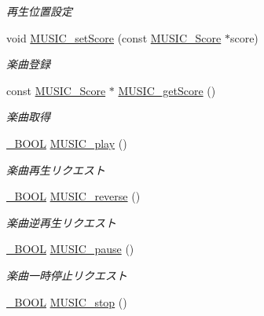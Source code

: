 \begin{DoxyCompactItemize}
\begin{DoxyCompactList}\small\item\em 再生位置設定 \end{DoxyCompactList}\item 
void \hyperlink{music_8h_aa6d0fea87bf8436f1abda3968ef54a47_aa6d0fea87bf8436f1abda3968ef54a47}{M\+U\+S\+I\+C\+\_\+set\+Score} (const \hyperlink{music_8h_d3/dd6/structMUSIC__Score}{M\+U\+S\+I\+C\+\_\+\+Score} $\ast$score)
\begin{DoxyCompactList}\small\item\em 楽曲登録 \end{DoxyCompactList}\item 
const \hyperlink{music_8h_d3/dd6/structMUSIC__Score}{M\+U\+S\+I\+C\+\_\+\+Score} $\ast$ \hyperlink{music_8h_a685ed593f10455fd1286fcc7ab1011e7_a685ed593f10455fd1286fcc7ab1011e7}{M\+U\+S\+I\+C\+\_\+get\+Score} ()
\begin{DoxyCompactList}\small\item\em 楽曲取得 \end{DoxyCompactList}\item 
\hyperlink{stddef_8h_afbf708854fe02af8475a9ba02f3196cb_afbf708854fe02af8475a9ba02f3196cb}{\+\_\+\+B\+O\+O\+L} \hyperlink{music_8h_a9d41a9ee0630a3ffb22c5f0885d39ee5_a9d41a9ee0630a3ffb22c5f0885d39ee5}{M\+U\+S\+I\+C\+\_\+play} ()
\begin{DoxyCompactList}\small\item\em 楽曲再生リクエスト \end{DoxyCompactList}\item 
\hyperlink{stddef_8h_afbf708854fe02af8475a9ba02f3196cb_afbf708854fe02af8475a9ba02f3196cb}{\+\_\+\+B\+O\+O\+L} \hyperlink{music_8h_af043ae70cb6cffbf9ab4c4e759187a69_af043ae70cb6cffbf9ab4c4e759187a69}{M\+U\+S\+I\+C\+\_\+reverse} ()
\begin{DoxyCompactList}\small\item\em 楽曲逆再生リクエスト \end{DoxyCompactList}\item 
\hyperlink{stddef_8h_afbf708854fe02af8475a9ba02f3196cb_afbf708854fe02af8475a9ba02f3196cb}{\+\_\+\+B\+O\+O\+L} \hyperlink{music_8h_ab3bfb05da259d13f35fee514ebabc18e_ab3bfb05da259d13f35fee514ebabc18e}{M\+U\+S\+I\+C\+\_\+pause} ()
\begin{DoxyCompactList}\small\item\em 楽曲一時停止リクエスト \end{DoxyCompactList}\item 
\hyperlink{stddef_8h_afbf708854fe02af8475a9ba02f3196cb_afbf708854fe02af8475a9ba02f3196cb}{\+\_\+\+B\+O\+O\+L} \hyperlink{music_8h_a1b5b16eb8fa1e378eb6434f3314a6570_a1b5b16eb8fa1e378eb6434f3314a6570}{M\+U\+S\+I\+C\+\_\+stop} ()

\end{DoxyCompactItemize}
